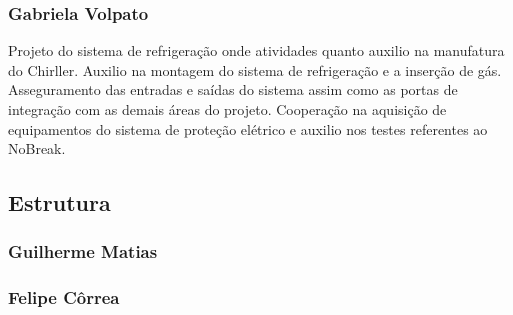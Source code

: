 \begin{apendicesenv}
\subsubsection{Gabriela Volpato}

Projeto do sistema de refrigeração onde atividades quanto auxilio na manufatura do Chirller.
Auxilio na montagem do sistema de refrigeração e a inserção de gás. 
Asseguramento das entradas e saídas do sistema assim como as portas de integração com as 
demais áreas do projeto. Cooperação na aquisição de equipamentos do sistema de proteção 
elétrico e auxilio nos testes referentes ao NoBreak.

\subsection{Estrutura}

\subsubsection{Guilherme Matias}

\subsubsection{Felipe Côrrea}

\noindent

\end{apendicesenv}
